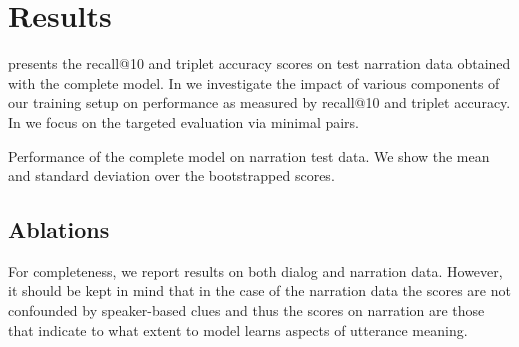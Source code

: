\section{Results}
 presents the recall@10 and triplet accuracy 
scores on test narration data obtained with the complete model. 
In  we investigate the impact of various components 
of our training setup on performance as measured by recall@10 and 
triplet accuracy. 
In  we focus on the targeted
evaluation via minimal pairs.

\label{sec:results}
\begin{table}[htb]
  \caption{Performance of the complete model on narration test
    data. We show the mean and standard deviation over the
    bootstrapped scores.}
  \label{tab:test_scores}
  
\end{table}


\subsection{Ablations}
\label{sec:ablations}
For completeness, we report results on both dialog and narration
data. However, it should be kept in mind that in the case of the
narration data the scores are not confounded by speaker-based clues
and thus the scores on narration are those that indicate to what extent to
model learns aspects of utterance meaning.

